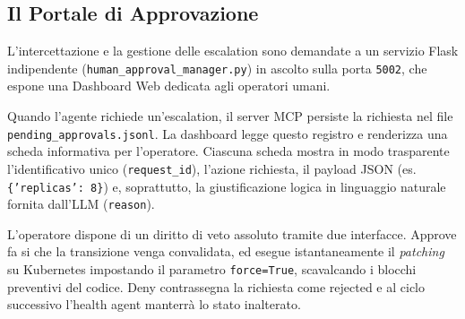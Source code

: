 \subsection*{Il Portale di Approvazione}
L'intercettazione e la gestione delle escalation sono demandate a un servizio Flask indipendente (\texttt{human\_approval\_manager.py}) in ascolto sulla porta \texttt{5002}, che espone una Dashboard Web dedicata agli operatori umani. 

Quando l'agente richiede un'escalation, il server MCP persiste la richiesta nel file \texttt{pending\_approvals.jsonl}. La dashboard legge questo registro e renderizza una scheda informativa per l'operatore. Ciascuna scheda mostra in modo trasparente l'identificativo unico (\texttt{request\_id}), l'azione richiesta, il payload JSON (es. \texttt{\{'replicas': 8\}}) e, soprattutto, la giustificazione logica in linguaggio naturale fornita dall'LLM (\texttt{reason}).

L'operatore dispone di un diritto di veto assoluto tramite due interfacce. Approve fa si che la transizione venga convalidata, ed esegue istantaneamente il \textit{patching} su Kubernetes impostando il parametro \texttt{force=True}, scavalcando i blocchi preventivi del codice. Deny contrassegna la richiesta come rejected e al ciclo successivo l'health agent manterrà lo stato inalterato. 
